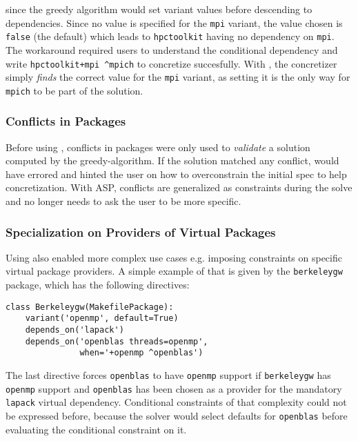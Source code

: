since the greedy algorithm would set variant values before descending to dependencies.
Since no value is specified for the \texttt{mpi} variant, the value chosen is
\texttt{false} (the default) which leads to \texttt{hpctoolkit} having no dependency on
\texttt{mpi}. The workaround required users to understand the conditional dependency and
write \texttt{hpctoolkit+mpi \^{}mpich} to concretize succesfully. With \clingo{}, the
concretizer simply {\it finds} the correct value for the \texttt{mpi} variant, as
setting it is the only way for {\tt mpich} to be part of the solution.



\subsubsection{Conflicts in Packages}
Before using \clingo{}, conflicts in packages were only used to \emph{validate} a
solution computed by the greedy-algorithm. If the solution matched any conflict,
\spack{} would have errored and hinted the user on how to overconstrain the initial spec
to help concretization. With ASP, conflicts are generalized as constraints during the
solve\footnotemark{} and \spack{} no longer needs to ask the user to be more specific.

\subsubsection{Specialization on Providers of Virtual Packages}
Using \clingo{} also enabled more complex use cases e.g. imposing constraints on
specific virtual package providers. A simple example of that is given by the
\texttt{berkeleygw} package, which has the following directives:

\begin{verbatim}
class Berkeleygw(MakefilePackage):
    variant('openmp', default=True)
    depends_on('lapack')
    depends_on('openblas threads=openmp',
               when='+openmp ^openblas')
\end{verbatim}

The last directive forces \texttt{openblas} to have \texttt{openmp} support if
\texttt{berkeleygw} has \texttt{openmp} support and \texttt{openblas} has been chosen as
a provider for the mandatory \texttt{lapack} virtual dependency. Conditional constraints
of that complexity could not be expressed before, because the solver would select
defaults for {\tt openblas} before evaluating the conditional constraint on it.
